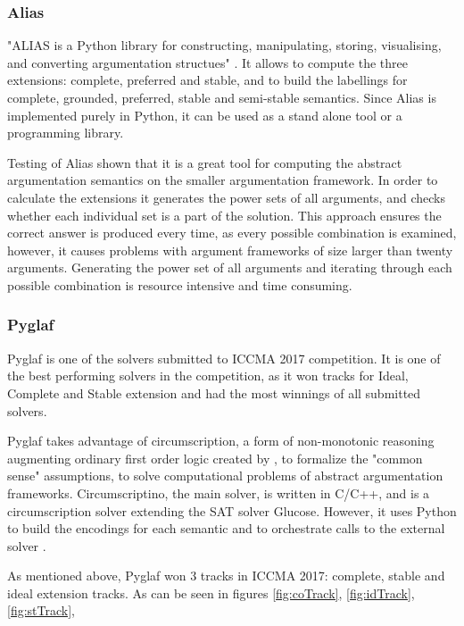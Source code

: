 \subsubsection{Alias}
"ALIAS is a Python library for constructing, manipulating, storing, visualising, and converting argumentation structues" \citep{alias}. It allows to compute the three extensions: complete, preferred and stable, and to build the labellings for complete, grounded, preferred, stable and semi-stable semantics. Since Alias is implemented purely in Python, it can be used as a stand alone tool or a programming library. 

Testing of Alias shown that it is a great tool for computing the abstract argumentation semantics on the smaller argumentation framework. In order to calculate the extensions it generates the power sets of all arguments, and checks whether each individual set is a part of the solution. This approach ensures the correct answer is produced every time, as every possible combination is examined, however, it causes problems with argument frameworks of size larger than twenty arguments. Generating the power set of all arguments and iterating through each possible combination is resource intensive and time consuming. 


\subsubsection{Pyglaf}
Pyglaf is one of the solvers submitted to ICCMA 2017 competition. It is one of the best performing solvers in the competition, as it won tracks for Ideal, Complete and Stable extension and had the most winnings of all submitted solvers.

Pyglaf takes advantage of circumscription, a form of non-monotonic reasoning augmenting ordinary first order logic created by \citet{circumpscription}, to formalize the "common sense" assumptions, to solve computational problems of abstract argumentation frameworks.  Circumscriptino, the main solver, is written in C/C++, and is a circumscription solver extending the SAT solver Glucose. However, it uses Python to build the encodings for each semantic and to orchestrate calls to the external solver \citep{pyglaf}. 

As mentioned above, Pyglaf won 3 tracks in ICCMA 2017: complete, stable and ideal extension tracks. As can be seen in figures \ref{fig:coTrack}, \ref{fig:idTrack}, \ref{fig:stTrack}, 

